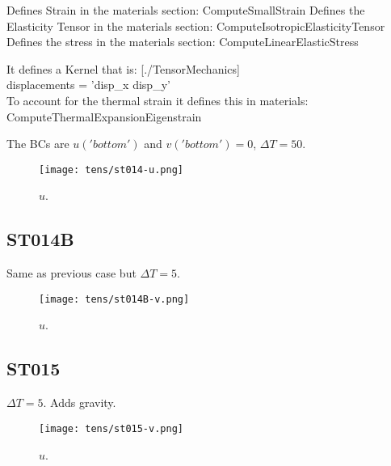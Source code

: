 \documentclass[11pt,letterpaper]{article}
\begin{document}
Defines Strain in the materials section: ComputeSmallStrain
Defines the Elasticity Tensor in the materials section: ComputeIsotropicElasticityTensor
Defines the stress in the materials section: ComputeLinearElasticStress

It defines a Kernel that is:
[./TensorMechanics]\\
displacements = 'disp\_x disp\_y'\\

To account for the thermal strain it defines this in materials: ComputeThermalExpansionEigenstrain

The BCs are $u('bottom')$ and $v('bottom') = 0$, $\Delta T=50$.

\begin{figure}[H]
	\centering
	\texttt{[image: tens/st014-u.png]}
	\hfill
	\caption{$u$.}
	\label{fig:st14}
\end{figure}

\subsection{ST014B}

Same as previous case but $\Delta T=5$.

\begin{figure}[H]
	\centering
	\texttt{[image: tens/st014B-v.png]}
	\hfill
	\caption{$u$.}
	\label{fig:st14B}
\end{figure}

\subsection{ST015}

$\Delta T=5$. Adds gravity.

\begin{figure}[H]
	\centering
	\texttt{[image: tens/st015-v.png]}
	\hfill
	\caption{$u$.}
	\label{fig:st15}
\end{figure}

\pagebreak 


\end{document}
